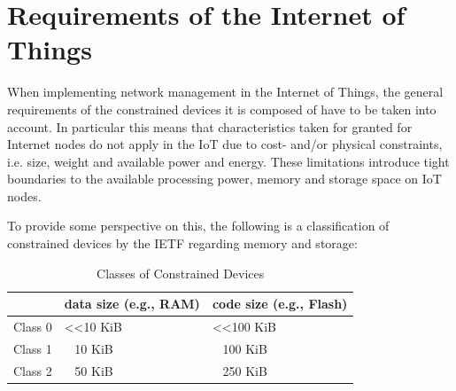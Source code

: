 \documentclass[conference]{IEEEtran}
\begin{document}







  



\section{Requirements of the Internet of Things} %
\label{sub:requirements_introduced_by_the_internet_of_things}

When implementing network management in the Internet of Things, the general requirements of the constrained devices it is composed of have to be taken into account. In particular this means that characteristics taken for granted for Internet nodes do not apply in the IoT due to cost- and/or physical constraints, i.e. size, weight and available power and energy\cite{Ersue}. These limitations introduce tight boundaries to the available processing power, memory and storage space on IoT nodes. 

To provide some perspective on this, the following is a classification of constrained devices by the IETF regarding memory and storage:

  \begin{table}[h]
  \begin{center}
  \begin{tabular}{|l|l|l|}
  \hline
  \textbf{} & \textbf{data size (e.g., RAM)}  & \textbf{code size (e.g., Flash)} \\ \hline
  Class 0   & \textless\textless 10 KiB & \textless\textless 100 KiB   \\
  Class 1   & ~ 10 KiB                  & ~ 100 KiB                    \\
  Class 2   & ~ 50 KiB                  & ~ 250 KiB                    \\ \hline
  \end{tabular}
  \end{center}
  \label{table:device-classes}
  \caption{Classes of Constrained Devices\cite{Ersue}}
  \end{table}
\end{document}
